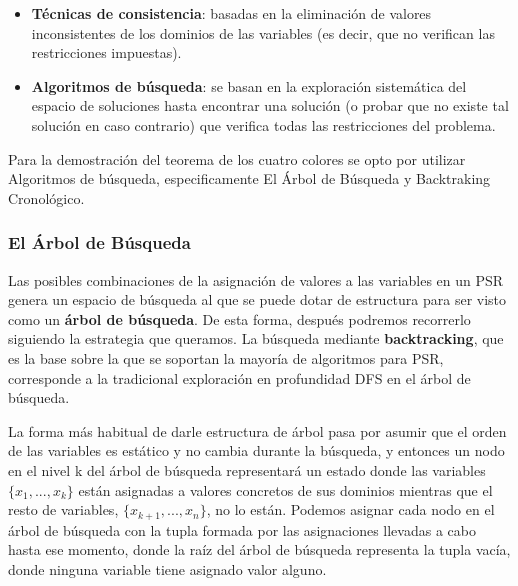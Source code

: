 \documentclass[a4paper]{article}
\begin{document}
\begin{itemize}
	 
\item \textbf{Técnicas de consistencia}: basadas en la eliminación de valores inconsistentes de los dominios de las variables (es decir, que no verifican las restricciones impuestas).
\item \textbf{Algoritmos de búsqueda}: se basan en la exploración sistemática del espacio de soluciones hasta encontrar una solución (o probar que no existe tal solución en caso contrario) que verifica todas las restricciones del problema.
\end{itemize}

Para la demostración del teorema de los cuatro colores se opto por utilizar Algoritmos de búsqueda, especificamente El Árbol de Búsqueda y Backtraking Cronológico.

\subsubsection*{El Árbol de Búsqueda}

Las posibles combinaciones de la asignación de valores a las variables en un PSR genera un espacio de búsqueda al que se puede dotar de estructura para ser visto como un \textbf{árbol de búsqueda}. De esta forma, después podremos recorrerlo siguiendo la estrategia que queramos. La búsqueda mediante \textbf{backtracking}, que es la base sobre la que se soportan la mayoría de algoritmos para PSR, corresponde a la tradicional exploración en profundidad DFS en el árbol de búsqueda.

La forma más habitual de darle estructura de árbol pasa por asumir que el orden de las variables es estático y no cambia durante la búsqueda, y entonces un nodo en el nivel k
del árbol de búsqueda representará un estado donde las variables $\{x_1,...,x_k\}$ están asignadas a valores concretos de sus dominios mientras que el resto de variables, $\{x_{k+1},...,x_n\}$, no lo están. Podemos asignar cada nodo en el árbol de búsqueda con la tupla formada por las asignaciones llevadas a cabo hasta ese momento, donde la raíz del árbol de búsqueda representa la tupla vacía, donde ninguna variable tiene asignado valor alguno.\\
 
\end{document}
